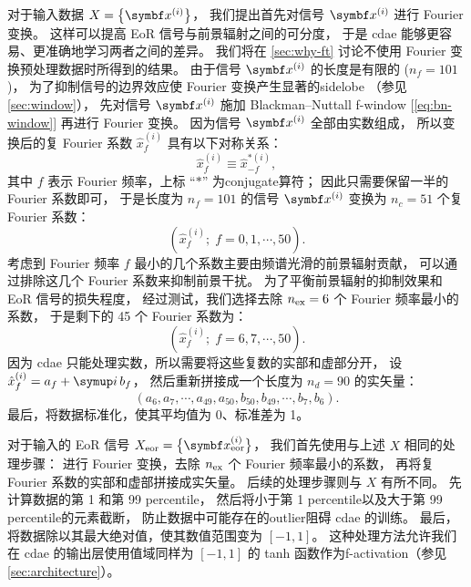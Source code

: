 对于输入数据 $X = \big\{ \B{x}^{(i)} \big\}$，
我们提出首先对信号 $\B{x}^{(i)}$ 进行 Fourier 变换。
这样可以提高 EoR 信号与前景辐射之间的可分度，
于是 \ac{cdae} 能够更容易、更准确地学习两者之间的差异。
我们将在 \autoref{sec:why-ft} 讨论不使用 Fourier 变换预处理数据时所得到的结果。
由于信号 $\B{x}^{(i)}$ 的长度是有限的 ($n_f = 101$)，
为了抑制信号的边界效应使 Fourier 变换产生显著的\ac{sidelobe}
（参见 \autoref{sec:window}），
先对信号 $\B{x}^{(i)}$ 施加 Blackman--Nuttall \ac{f-window}
\cite{chapman2016} [\autoref{eq:bn-window}]
再进行 Fourier 变换。
因为信号 $\B{x}^{(i)}$ 全部由实数组成，
所以变换后的复 Fourier 系数 $\hat{x}^{(i)}_{f}$ 具有以下对称关系：
\begin{equation}
  \hat{x}^{(i)}_{f} \equiv \hat{x}^{*(i)}_{-f} ,
\end{equation}
其中 $f$ 表示 Fourier 频率，上标 \enquote{$*$} 为\ac{conjugate}算符；
因此只需要保留一半的 Fourier 系数即可，
于是长度为 $n_f = 101$ 的信号 $\B{x}^{(i)}$ 变换为
$n_c = 51$ 个复 Fourier 系数：
\begin{equation}
  \left( \hat{x}^{(i)}_f; \; f = 0, 1, \cdots, 50 \right) .
\end{equation}
考虑到 Fourier 频率 $f$ 最小的几个系数主要由频谱光滑的前景辐射贡献，
可以通过排除这几个 Fourier 系数来抑制前景干扰。
为了平衡前景辐射的抑制效果和 EoR 信号的损失程度，
经过测试，我们选择去除 $n_{\mathrm{ex}} = 6$ 个 Fourier 频率最小的系数，
于是剩下的 45 个 Fourier 系数为：
\begin{equation}
  \left( \hat{x}^{(i)}_f; \; f = 6, 7, \cdots, 50 \right) .
\end{equation}
因为 \ac{cdae} 只能处理实数，所以需要将这些复数的实部和虚部分开，
设 $\hat{x}^{(i)}_f = a_f + \Ci\,b_f$，
然后重新拼接成一个长度为 $n_d = 90$ 的实矢量：
\begin{equation}
  (a_6, a_7, \cdots, a_{49}, a_{50},
   b_{50}, b_{49}, \cdots, b_7, b_6) .
\end{equation}
最后，将数据标准化，使其平均值为 0、标准差为 1。

对于输入的 EoR 信号 $X_{\R{eor}} = \big\{ \B{x}^{(i)}_{\R{eor}} \big\}$，
我们首先使用与上述 $X$ 相同的处理步骤：
进行 Fourier 变换，去除 $n_{\mathrm{ex}}$ 个 Fourier 频率最小的系数，
再将复 Fourier 系数的实部和虚部拼接成实矢量。
后续的处理步骤则与 $X$ 有所不同。
先计算数据的第 1 和第 99 \ac{percentile}，
然后将小于第 1 \ac{percentile}以及大于第 99 \ac{percentile}的元素截断，
防止数据中可能存在的\ac{outlier}阻碍 \ac{cdae} 的训练。
最后，将数据除以其最大绝对值，使其数值范围变为 $[-1, 1]$。
这种处理方法允许我们在 \ac{cdae} 的输出层使用值域同样为 $[-1, 1]$
的 tanh 函数作为\ac{f-activation}（参见 \autoref{sec:architecture}）。

